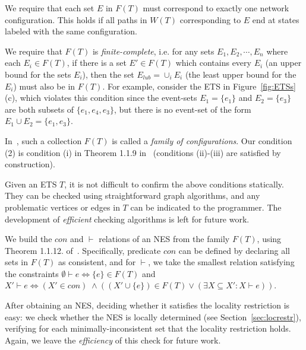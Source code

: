 \documentclass[pldi-cameraready]{sigplanconf}
\newcommand*\xmnote[3][0pt]{}
\begin{document}
\begin{compactenum}
\item We require that each set $E$ in $F(T)$ must correspond to
  exactly one network configuration. This holds if all paths in
  $W(T)$ corresponding to $E$ end at states labeled with the same
  configuration.

\item We require that $F(T)$ is {\em finite-complete}, i.e. for any
  sets $E_1,E_2,\cdots,E_n$ where each $E_i \in F(T)$, if there is a set
  $E' \in F(T)$ which contains
  every $E_i$ (an upper bound for the sets $E_i$), then the set $E_{lub} = \cup_i E_i$ (the least upper
  bound for the $E_i$) must also be in $F(T)$.  For example, consider the
  ETS in Figure~\ref{fig:ETSs}(c), which violates this condition since
  the event-sets $E_1=\{e_1\}$ and $E_2=\{e_3\}$ are both subsets of
  $\{e_1, e_4, e_3\}$, but there is no event-set of the form $E_1 \cup
  E_2 = \{e_1, e_3\}$.
\end{compactenum}

\noindent In~\cite{winskel1987event}, such a collection $F(T)$ is
called a {\em family of configurations}. Our condition (2) is
condition (i) in Theorem 1.1.9 in~\cite{winskel1987event} (conditions
(ii)-(iii) are satisfied by construction).

Given an ETS $T$, it is not difficult to confirm the above conditions
\xmnote{\FiveStar}{Q8}statically.
They can be checked using
straightforward graph algorithms, and any problematic vertices or
edges in $T$ can be indicated to the programmer.
The development of {\em efficient} checking algorithms is left
for future work.

We build the $con$ and $\vdash$ relations of an NES from
the family $F(T)$, using Theorem
1.1.12. of~\cite{winskel1987event}. Specifically, predicate $con$ can be defined by
declaring all sets in $F(T)$ as consistent, and for $\vdash$, we take the
smallest relation satisfying the constraints $\emptyset \vdash e \iff
\{e\} \in F(T)$ and $X' \vdash e \iff (X' \in con)\; \land ((X' \cup
\{e\}) \in F(T) \lor (\exists X \subseteq X' : X \vdash e))$.



After obtaining an NES, deciding whether it satisfies the locality
restriction is easy: we check whether the NES is locally determined
(see Section~\ref{sec:locrestr}), verifying for each
minimally-inconsistent set that the locality restriction holds.
Again, we leave the {\em efficiency} of this check for future work.
\end{document}
